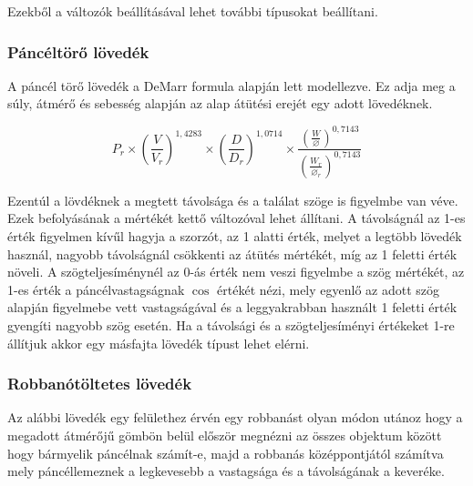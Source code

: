\documentclass[
]{thesis-ekf}
\theoremstyle{definition}
\theoremstyle{remark}
\begin{document}


Ezekből a változók beállításával lehet további típusokat beállítani.

\subsubsection{Páncéltörő lövedék}

A páncél törő lövedék a DeMarr formula alapján lett modellezve. Ez adja meg a súly, átmérő és sebesség alapján az alap átütési erejét egy adott lövedéknek.

\begin{equation}
 P_r \times (\frac{V}{V_r})^{1,4283} \times ( \frac{D}{D_r})^{1,0714}  \times \frac{(\frac{W}{\varnothing})^{0,7143}}{(\frac{W_r}{\varnothing_r})^{0,7143}}
\end{equation}

Ezentúl a lövdéknek a megtett távolsága és a találat szöge is figyelmbe van véve. Ezek befolyásának a mértékét kettő változóval lehet állítani. A távolságnál az 1-es érték figyelmen kívűl hagyja a szorzót, az 1 alatti érték, melyet a legtöbb lövedék használ, nagyobb távolságnál csökkenti az átütés mértékét, míg az 1 feletti érték növeli. A szögteljesíménynél az 0-ás érték nem veszi figyelmbe a szög mértékét, az 1-es érték a páncélvastagságnak $\cos$ értékét nézi, mely egyenlő az adott szög alapján figyelmebe vett vastagságával és a leggyakrabban használt 1 feletti érték gyengíti nagyobb szög esetén. Ha a távolsági és a szögteljesíményi értékeket 1-re állítjuk akkor egy másfajta lövedék típust lehet elérni.



\subsubsection{Robbanótöltetes lövedék}

Az alábbi lövedék egy felülethez érvén egy robbanást olyan módon utánoz hogy a megadott átmérőjű gömbön belül először megnézni az összes objektum között hogy bármyelik páncélnak számít-e, majd a robbanás középpontjától számítva mely páncéllemeznek a legkevesebb a vastagsága és a távolságának a keveréke.


\end{document}
